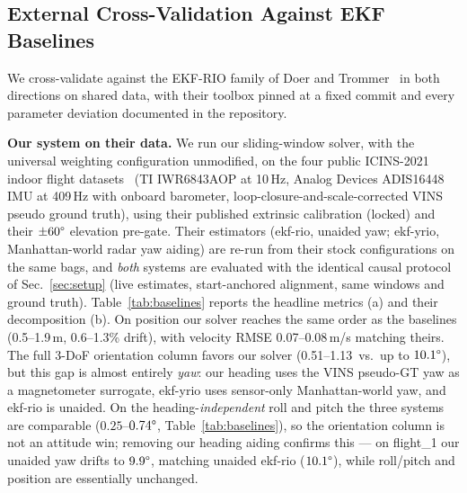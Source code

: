 \documentclass[conference]{IEEEtran}
\begin{document}
\subsection{External Cross-Validation Against EKF Baselines}
\label{sec:baselines}
We cross-validate against the EKF-RIO family of Doer and
Trommer~\cite{doer2020ekf,doer2021yrio} in both directions on shared
data, with their toolbox pinned at a fixed commit and every parameter
deviation documented in the repository.

\textbf{Our system on their data.}  We run our sliding-window solver,
with the universal weighting configuration unmodified, on the four
public ICINS-2021 indoor flight datasets~\cite{doer2021yrio}
(TI IWR6843AOP at 10\,Hz, Analog Devices ADIS16448 IMU at 409\,Hz with
onboard barometer, loop-closure-and-scale-corrected VINS pseudo ground
truth), using their published extrinsic calibration (locked) and
their $\pm 60\degree$ elevation pre-gate.  Their estimators
(\mbox{ekf-rio}, unaided yaw; \mbox{ekf-yrio}, Manhattan-world radar
yaw aiding) are re-run from their stock configurations on the same
bags, and \emph{both} systems are evaluated with the identical causal
protocol of Sec.~\ref{sec:setup} (live estimates, start-anchored
alignment, same windows and ground truth).
Table~\ref{tab:baselines} reports the headline metrics (a) and their
decomposition (b).  On position our
solver reaches the same order as the baselines (0.5--1.9\,m,
0.6--1.3\% drift), with velocity RMSE 0.07--0.08\,m/s matching theirs.
The full 3-DoF orientation column favors our solver
(0.51--1.13\degree\ vs.\ up to $10.1\degree$), but this gap is almost
entirely \emph{yaw}: our heading uses the VINS pseudo-GT yaw as a
magnetometer surrogate, ekf-yrio uses sensor-only Manhattan-world yaw,
and ekf-rio is unaided.
On the heading-\emph{independent} roll and pitch the three systems are
comparable ($0.25$--$0.74\degree$, Table~\ref{tab:baselines}),
so the orientation column is not an attitude win; removing our heading
aiding confirms this --- on flight\_1 our unaided yaw drifts to
$9.9\degree$, matching unaided ekf-rio ($10.1\degree$), while roll/pitch
and position are essentially unchanged.
\end{document}
